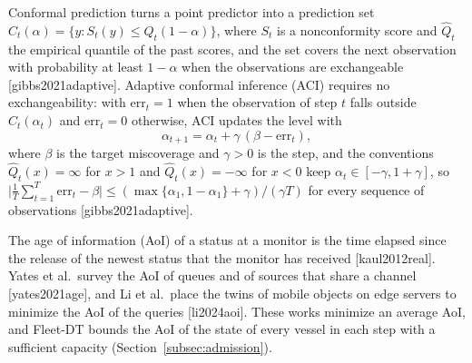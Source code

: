 Conformal prediction turns a point predictor into a prediction set $\hat{C}_t(\alpha) = \{y : S_t(y) \leq \hat{Q}_t(1 - \alpha)\}$, where $S_t$ is a nonconformity score and $\hat{Q}_t$ the empirical quantile of the past scores, and the set covers the next observation with probability at least $1 - \alpha$ when the observations are exchangeable [gibbs2021adaptive]. Adaptive conformal inference (ACI) requires no exchangeability: with $\mathrm{err}_t = 1$ when the observation of step $t$ falls outside $\hat{C}_t(\alpha_t)$ and $\mathrm{err}_t = 0$ otherwise, ACI updates the level with
\begin{equation}
\alpha_{t+1} = \alpha_t + \gamma\,(\beta - \mathrm{err}_t),
\label{eq:aci_bg}
\end{equation}
where $\beta$ is the target miscoverage and $\gamma > 0$ is the step, and the conventions $\hat{Q}_t(x) = \infty$ for $x > 1$ and $\hat{Q}_t(x) = -\infty$ for $x < 0$ keep $\alpha_t \in [-\gamma, 1 + \gamma]$, so $\big|\frac{1}{T}\sum_{t=1}^{T} \mathrm{err}_t - \beta\big| \leq (\max\{\alpha_1, 1 - \alpha_1\} + \gamma)/(\gamma T)$ for every sequence of observations [gibbs2021adaptive].

The age of information (AoI) of a status at a monitor is the time elapsed since the release of the newest status that the monitor has received [kaul2012real]. Yates et al.\ survey the AoI of queues and of sources that share a channel [yates2021age], and Li et al.\ place the twins of mobile objects on edge servers to minimize the AoI of the queries [li2024aoi]. These works minimize an average AoI, and Fleet-DT bounds the AoI of the state of every vessel in each step with a sufficient capacity (Section~\ref{subsec:admission}).
